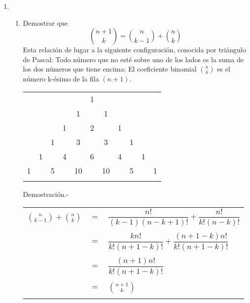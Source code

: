 \begin{enumerate}
      \item 
        \begin{enumerate}[\bfseries (a)]
          \item Demostrar que $${n +1 \choose k} = {n \choose k - 1} + {n \choose k}$$ Esta relación de lugar a la siguiente configuración, conocida por triángulo de Pascal: Todo número que no esté sobre uno de los lados es la suma de los dos números que tiene encima: El coeficiente binomial ${n \choose k}$ es el número k-ésimo de la fila $(n+1)$.
            \begin{center}
              \begin{tabular}{ccccccccccc}
                &    &    &    &    &  1 &    &    &    &    &   \\
                &    &    &    &  1 &    &  1 &    &    &    &   \\
                &    &    &  1 &    &  2 &    &  1 &    &    &   \\
                &    &  1 &    &  3 &    &  3 &    &  1 &    &   \\
                &  1 &    &  4 &    &  6 &    &  4 &    &  1 &   \\
              1 &    &  5 &    & 10 &    & 10 &    &  5 &    & 1 \\\\
              \end{tabular}
            \end{center}
          Demostración.- \; \\
            \begin{center}
              \begin{tabular}{r c l}
                $ {n \choose k-1}  +  {n \choose k} $&$=$&$\dfrac{n!}{(k-1)(n-k+1)!}+ \dfrac{n!}{k!(n-k)!}$\\\\
                &$=$&$\dfrac{kn!}{k!(n+1-k)!} + \dfrac{(n+1-k)n!}{k!(n+1-k)!}$\\\\
                &$=$&$\dfrac{(n+1)n!}{k!(n+1-k)!}$\\\\
                &$=$&$ {n+1 \choose k} $\\\\
              \end{tabular}
            \end{center}


\end{enumerate}
\end{enumerate}
